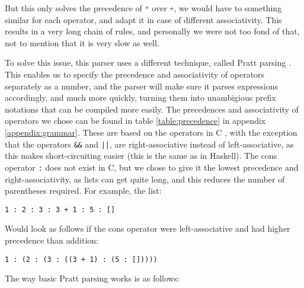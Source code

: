 But this only solves the precedence of \lstinline[language=rust]|*| over \lstinline[language=rust]|+|, we would have to something similar for each operator, and adapt it in case of different associativity. This results in a very long chain of rules, and personally we were not too fond of that, not to mention that it is very slow as well.

To solve this issue, this parser uses a different technique, called Pratt parsing \cite{kladov_2020}. This enables us to specify the precedence and associativity of operators separately as a number, and the parser will make sure it parses expressions accordingly, and much more quickly, turning them into unambigious prefix notations that can be compiled more easily. The precedences and associativity of operators we chose can be found in table \ref{table:precedence} in appendix \ref{appendix:grammar}. These are based on the operators in C \cite{precedence}, with the exception that the operators \lstinline|&&| and \lstinline{||}, are right-associative instead of left-associative, as this makes short-circuiting easier (this is the same as in Haskell). The cons operator \lstinline|:| does not exist in C, but we chose to give it the lowest precedence and right-associativity, as lists can get quite long, and this reduces the number of parentheses required. For example, the list:

\begin{lstlisting}[language=spl]
1 : 2 : 3 : 3 + 1 : 5 : []
\end{lstlisting}

Would look as follows if the cons operator were left-associative and had higher precedence than addition:

\begin{lstlisting}[language=spl]
1 : (2 : (3 : ((3 + 1) : (5 : []))))
\end{lstlisting}

The way basic Pratt parsing works is as follows:

